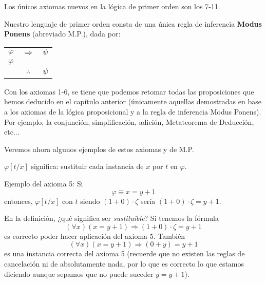 \documentclass[12pt]{report}
\theoremstyle{largebreak}
\begin{document}
    Los únicos axiomas nuevos en la lógica de primer orden son los 7-11.

    \begin{mydef}
        Nuestro lenguaje de primer orden consta de una única regla de inferencia \textbf{Modus Ponens} (abreviado M.P.), dada por:
        \begin{center}
            \begin{tabular}{c c c}
                $\varphi$ & $\Rightarrow$ & $\psi$ \\
                $\varphi$ &  &  \\
                \hline
                 & $\therefore$ & $\psi$ \\
            \end{tabular}
        \end{center}
    \end{mydef}

    Con los axiomas 1-6, se tiene que podemos retomar todas las proposiciones que hemos deducido en el capítulo anterior (únicamente aquellas demostradas en base a los axiomas de la lógica proposicional y a la regla de inferencia Modus Ponens). Por ejemplo, la conjunción, simplificación, adición, Metateorema de Deducción, etc...

    Veremos ahora algunos ejemplos de estos axiomas y de M.P.

    \begin{obs}
        $\varphi[t/x]$ significa: sustituir cada instancia de $x$ por $t$ en $\varphi$.
    \end{obs}

    \begin{exa}
        Ejemplo del axioma 5: Si
        \begin{equation*}
            \varphi\equiv x=y+1
        \end{equation*}
        entonces, $\varphi[t/x]$ con $t$ siendo $(1+0)\cdot\zeta$ sería $(1+0)\cdot\zeta=y+1$.
    \end{exa}

    \begin{exa}
        En la definición, ¿qué significa ser \textit{sustituible}? Si tenemos la fórmula
        \begin{equation*}
            (\forall x)(x=y+1)\Rightarrow(1+0)\cdot\zeta=y+1
        \end{equation*}
        es correcto poder hacer aplicación del axioma 5. También
        \begin{equation*}
            (\forall x)(x=y+1)\Rightarrow(0+y)=y+1
        \end{equation*}
        es una instancia correcta del axioma 5 (recuerde que no existen las reglas de cancelación ni de absolutamente nada, por lo que es correcto lo que estamos diciendo aunque sepamos que no puede suceder $y=y+1$).
    \end{exa}
\end{document}
